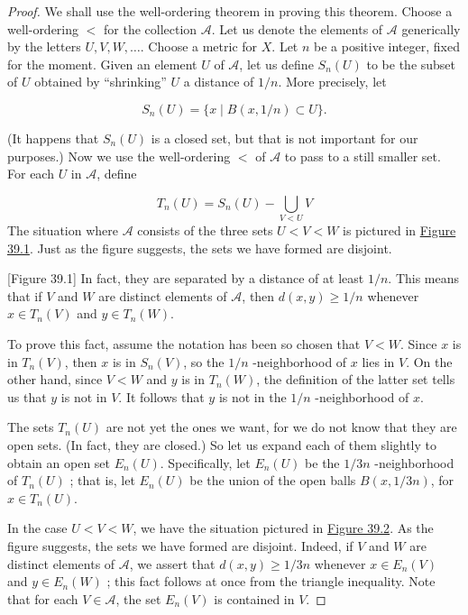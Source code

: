 \begin{proof}
 We shall use the well-ordering theorem in proving this theorem. Choose a well-ordering \(<\) for the collection \(\mathcal{A}\). Let us denote the elements of \(\mathcal{A}\) generically by the letters \(U,V,W,\ldots\).
Choose a metric for \(X\). Let \(n\) be a positive integer, fixed for the moment. Given an element \(U\) of \(\mathcal{A}\), let us define \(S_{n}(U)\) to be the subset of \(U\) obtained by ``shrinking'' \(U\) a distance of \(1/n\). More precisely, let

\[
S_{n}(U) = \{ x \mid B({x,1/n}) \subset U\}.
\]

(It happens that \(S_{n}(U)\) is a closed set, but that is not important for our purposes.) Now we use the well-ordering \(<\) of \(\mathcal{A}\) to pass to a still smaller set. For each \(U\) in \(\mathcal{A}\), define

\[
T_{n}(U) = S_{n}(U) - \mathop{\bigcup }\limits_{{V < U}}V
\]
The situation where \(\mathcal{A}\) consists of the three sets \(U < V < W\) is pictured in \hyperref[fig:39.1]{Figure 39.1}. Just as the figure suggests, the sets we have formed are disjoint.

[Figure 39.1]
In fact, they are separated by a distance of at least \(1/n\). This means that if \(V\) and \(W\) are distinct elements of \(\mathcal{A}\), then \(d({x,y}) \geq 1/n\) whenever \(x \in {T}_{n}(V)\) and \(y \in {T}_{n}(W)\).

To prove this fact, assume the notation has been so chosen that \(V < W\). Since \(x\) is in \(T_{n}(V)\), then \(x\) is in \(S_{n}(V)\), so the \(1/n\) -neighborhood of \(x\) lies in \(V\). On the other hand, since \(V < W\) and \(y\) is in \(T_{n}(W)\), the definition of the latter set tells us that \(y\) is not in \(V\). It follows that \(y\) is not in the \(1/n\) -neighborhood of \(x\).

The sets \(T_{n}(U)\) are not yet the ones we want, for we do not know that they are open sets. (In fact, they are closed.) So let us expand each of them slightly to obtain an open set \(E_{n}(U)\). Specifically, let \(E_{n}(U)\) be the \(1/{3n}\) -neighborhood of \(T_{n}(U)\) ; that is, let \(E_{n}(U)\) be the union of the open balls \(B({x,1/{3n}})\), for \(x \in {T}_{n}(U)\).

In the case \(U < V < W\), we have the situation pictured in \hyperref[fig:39.2]{Figure 39.2}. As the figure suggests, the sets we have formed are disjoint. Indeed, if \(V\) and \(W\) are distinct elements of \(\mathcal{A}\), we assert that \(d({x,y}) \geq 1/{3n}\) whenever \(x \in {E}_{n}(V)\) and \(y \in {E}_{n}(W)\) ; this fact follows at once from the triangle inequality. Note that for each \(V \in \mathcal{A}\), the set \(E_{n}(V)\) is contained in \(V\).


\end{proof}
